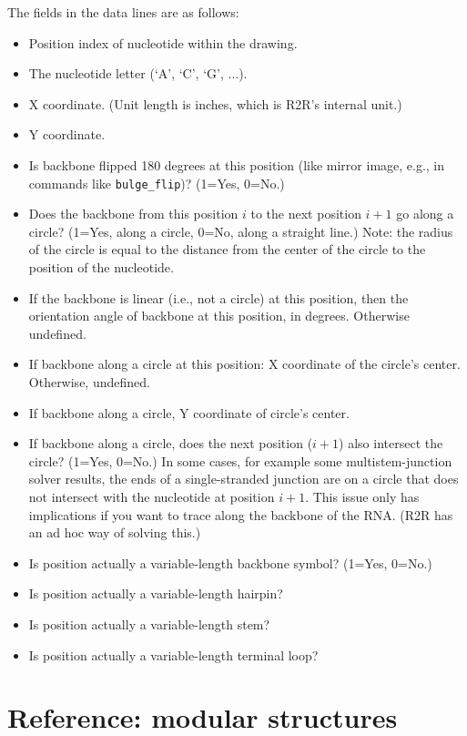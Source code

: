 \documentclass[letterpaper,12pt]{report}
\begin{document}
\begin{itemize}
The fields in the data lines are as follows:
\begin{itemize}
\item Position index of nucleotide within the drawing.
\item The nucleotide letter (`A', `C', `G', ...).
\item X coordinate.  (Unit length is inches, which is R2R's internal unit.)
\item Y coordinate.
\item Is backbone flipped 180 degrees at this position (like mirror image, e.g., in commands like {\tt bulge\_flip})?  (1=Yes, 0=No.)
\item Does the backbone from this position $i$ to the next position $i+1$ go along a circle?  (1=Yes, along a circle, 0=No, along a straight line.)  Note: the radius of the circle is equal to the distance from the center of the circle to the position of the nucleotide.
\item If the backbone is linear (i.e., not a circle) at this position, then the orientation angle of backbone at this position, in degrees.  Otherwise undefined.
\item If backbone along a circle at this position: X coordinate of the circle's center.  Otherwise, undefined.
\item If backbone along a circle, Y coordinate of circle's center.
\item If backbone along a circle, does the next position ($i+1$) also intersect the circle?  (1=Yes, 0=No.)  In some cases, for example some multistem-junction solver results, the ends of a single-stranded junction are on a circle that does not intersect with the nucleotide at position $i+1$.  This issue only has implications if you want to trace along the backbone of the RNA.  (R2R has an ad hoc way of solving this.)
\item Is position actually a variable-length backbone symbol?  (1=Yes, 0=No.)
\item Is position actually a variable-length hairpin?
\item Is position actually a variable-length stem?
\item Is position actually a variable-length terminal loop?
\end{itemize}
\end{itemize}

\chapter{Reference: modular structures}
\label{chpt:modular}
\end{document}
